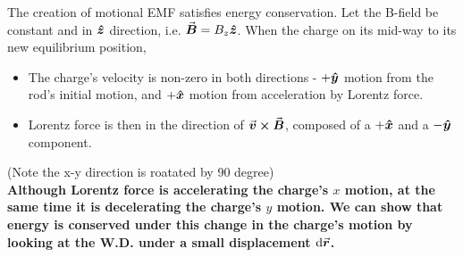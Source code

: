 \documentclass[class=article, crop=false, 12pt]{standalone}
\begin{document}
The creation of motional EMF satisfies energy conservation. 
Let the B-field be constant and in $\vu*{z}$ direction, i.e. $\va*{B}=B_z\vu*{z}$.
When the charge on its mid-way to its new equilibrium position, 
\begin{itemize}
    \item The charge's velocity is non-zero in both directions - 
    $+\vu*{y}$ motion from the rod's initial motion,
    and $+\vu*{x}$ motion from acceleration by Lorentz force.

    \item Lorentz force is then in the direction of $\va*{v}\cross\va*{B}$,
    composed of a $+\vu*{x}$ and a $-\vu*{y}$ component.
    
\end{itemize} 

(Note the x-y direction is roatated by 90 degree)\\

\bf{Although Lorentz force is accelerating the charge's $x$ motion,
at the same time it is decelerating the charge's $y$ motion.}
We can show that energy is conserved under this change in the charge's motion 
by looking at the W.D. under a small displacement $\dd{\va*{r}}$.
\end{document}
